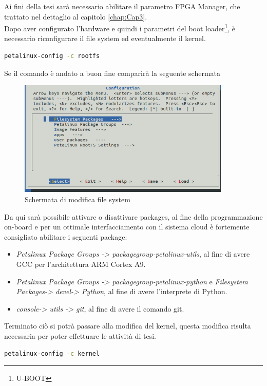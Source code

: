 Ai fini della tesi sarà necessario abilitare il parametro FPGA Manager, che trattato nel dettaglio al capitolo \ref{chap:Cap3}.\\
Dopo aver configurato l'hardware e quindi i parametri del boot loader\footnote{U-BOOT}, è necessario riconfigurare il file system ed eventualmente il kernel.\clearpage
\begin{lstlisting}[language=sh, label=lst:FileSystem, caption={Comando necessario alla riconfigurazione del file system}]
petalinux-config -c rootfs

\end{lstlisting}
Se il comando è andato a buon fine comparirà la seguente schermata
\begin{figure}[h]
\centering
\includegraphics[width=0.9\textwidth]{images/peta1.png}
\caption{Schermata di modifica file system}
\end{figure}
Da qui sarà possibile attivare o disattivare packages, al fine della programmazione on-board e per un ottimale interfacciamento con il sistema cloud è fortemente consigliato abilitare i seguenti package:
\begin{itemize}
    \item \textit{Petalinux Package Groups -> packagegroup-petalinux-utils}, al fine di avere GCC per l'architettura ARM Cortex A9.
    \item \textit{Petalinux Package Groups -> packagegroup-petalinux-python} e \textit{Filesystem Packages-> devel-> Python}, al fine di avere l'interprete di Python.
    \item \textit{console-> utils -> git}, al fine di avere il comando git.
\end{itemize}
Terminato ciò si potrà passare alla modifica del kernel, questa modifica risulta necessaria per poter effettuare le attività di tesi.
\begin{lstlisting}[language=sh, label=lst:sh, caption={Comando necessario alla riconfigurazione del kernel}]
petalinux-config -c kernel
\end{lstlisting}
